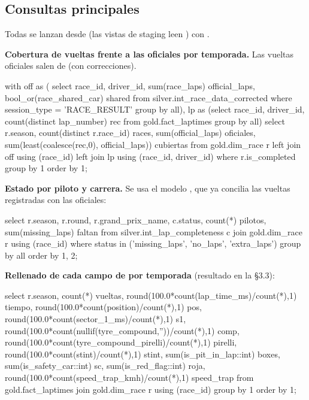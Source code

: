 \subsection{Consultas principales}

Todas se lanzan desde  (las vistas de staging leen ) con .

\textbf{Cobertura de vueltas frente a las oficiales por temporada.} Las vueltas oficiales salen de  (con correcciones).

\begin{codigo}
with off as (
  select race_id, driver_id, sum(race_laps) official_laps, bool_or(race_shared_car) shared
  from silver.int_race_data_corrected where session_type = 'RACE_RESULT' group by all),
lp as (select race_id, driver_id, count(distinct lap_number) rec from gold.fact_laptimes group by all)
select r.season, count(distinct r.race_id) races,
       sum(official_laps) oficiales, sum(least(coalesce(rec,0), official_laps)) cubiertas
from gold.dim_race r left join off using (race_id) left join lp using (race_id, driver_id)
where r.is_completed group by 1 order by 1;
\end{codigo}

\textbf{Estado por piloto y carrera.} Se usa el modelo , que ya concilia las vueltas registradas con las oficiales:

\begin{codigo}
select r.season, r.round, r.grand_prix_name, c.status, count(*) pilotos, sum(missing_laps) faltan
from silver.int_lap_completeness c join gold.dim_race r using (race_id)
where status in ('missing_laps', 'no_laps', 'extra_laps') group by all order by 1, 2;
\end{codigo}

\textbf{Rellenado de cada campo de  por temporada} (resultado en la §3.3):

\begin{codigo}
select r.season, count(*) vueltas,
  round(100.0*count(lap_time_ms)/count(*),1) tiempo, round(100.0*count(position)/count(*),1) pos,
  round(100.0*count(sector_1_ms)/count(*),1) s1, round(100.0*count(nullif(tyre_compound,''))/count(*),1) comp,
  round(100.0*count(tyre_compound_pirelli)/count(*),1) pirelli, round(100.0*count(stint)/count(*),1) stint,
  sum(is_pit_in_lap::int) boxes, sum(is_safety_car::int) sc, sum(is_red_flag::int) roja,
  round(100.0*count(speed_trap_kmh)/count(*),1) speed_trap
from gold.fact_laptimes join gold.dim_race r using (race_id) group by 1 order by 1;
\end{codigo}

